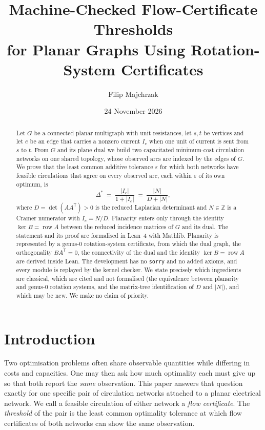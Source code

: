 \documentclass[11pt]{amsart}
\title[Machine-checked flow-certificate thresholds for planar graphs]{Machine-Checked Flow-Certificate Thresholds\\ for Planar Graphs Using Rotation-System Certificates}
\author{Filip Majchrzak}
\date{24 November 2026}
\theoremstyle{plain}
\theoremstyle{definition}
\theoremstyle{remark}
\newcommand{\Z}{\mathbb{Z}}
\newcommand{\T}{\mathsf{T}}
\newcommand{\row}{\operatorname{row}}
\newcommand{\code}[1]{\texttt{#1}}
\begin{document}
\begin{abstract}
Let $G$ be a connected planar multigraph with unit resistances, let $s,t$ be vertices and let $e$ be an edge that
carries a nonzero current $I_e$ when one unit of current is sent from $s$ to $t$. From $G$ and its plane dual we
build two capacitated minimum-cost circulation networks on one shared topology, whose observed arcs are indexed by
the edges of $G$. We prove that the least common additive tolerance $\varepsilon$ for which both networks have
feasible circulations that agree on every observed arc, each within $\varepsilon$ of its own optimum, is
\[
\Delta^* \;=\; \frac{|I_e|}{1+|I_e|} \;=\; \frac{|N|}{D+|N|},
\]
where $D=\det(AA^{\T})>0$ is the reduced Laplacian determinant and $N\in\Z$ is a Cramer numerator with $I_e=N/D$.
Planarity enters only through the identity $\ker B=\row A$ between the reduced incidence matrices of $G$ and its
dual. The statement and its proof are formalised in Lean~4 with Mathlib. Planarity is represented by a genus-$0$
rotation-system certificate, from which the dual graph, the orthogonality $BA^{\T}=0$, the connectivity of the dual
and the identity $\ker B=\row A$ are derived inside Lean. The development has no \code{sorry} and no added axioms,
and every module is replayed by the kernel checker. We state precisely which ingredients are classical, which are
cited and not formalised (the equivalence between planarity and genus-$0$ rotation systems, and the matrix-tree
identification of $D$ and $|N|$), and which may be new. We make no claim of priority.
\end{abstract}

\maketitle

\section{Introduction}

Two optimisation problems often share observable quantities while differing in costs and capacities. One may then
ask how much optimality each must give up so that both report the \emph{same} observation. This paper answers that
question exactly for one specific pair of circulation networks attached to a planar electrical network. We call
a feasible circulation of either network a \emph{flow certificate}. The \emph{threshold} of the pair is the least
common optimality tolerance at which flow certificates of both networks can show the same observation.
\end{document}

